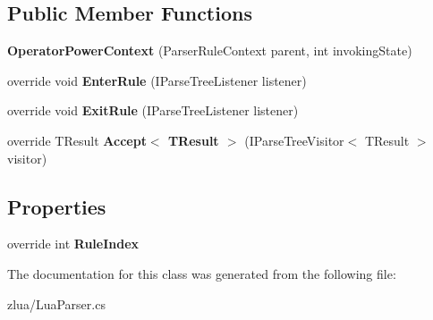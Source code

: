 \subsection*{Public Member Functions}
\begin{DoxyCompactItemize}
\item 
\mbox{\label{classzlua_1_1_lua_parser_1_1_operator_power_context_a3b1748e1d899b2a46ac119b51ee3adad}} 
{\bfseries Operator\+Power\+Context} (Parser\+Rule\+Context parent, int invoking\+State)
\item 
\mbox{\label{classzlua_1_1_lua_parser_1_1_operator_power_context_a9c0ee946ead1d85a471e78da3e14810a}} 
override void {\bfseries Enter\+Rule} (I\+Parse\+Tree\+Listener listener)
\item 
\mbox{\label{classzlua_1_1_lua_parser_1_1_operator_power_context_a1e5e5cb21381085154b4801c36467302}} 
override void {\bfseries Exit\+Rule} (I\+Parse\+Tree\+Listener listener)
\item 
\mbox{\label{classzlua_1_1_lua_parser_1_1_operator_power_context_a9d2ed07715d73a885383fcda36095353}} 
override T\+Result {\bfseries Accept$<$ T\+Result $>$} (I\+Parse\+Tree\+Visitor$<$ T\+Result $>$ visitor)
\end{DoxyCompactItemize}
\subsection*{Properties}
\begin{DoxyCompactItemize}
\item 
\mbox{\label{classzlua_1_1_lua_parser_1_1_operator_power_context_a6505124cb8625459ddadc81e8dbffba2}} 
override int {\bfseries Rule\+Index}
\end{DoxyCompactItemize}


The documentation for this class was generated from the following file\+:\begin{DoxyCompactItemize}
\item 
zlua/Lua\+Parser.\+cs\end{DoxyCompactItemize}
